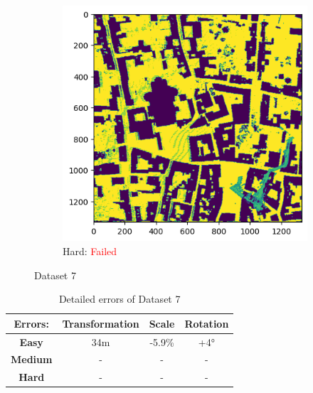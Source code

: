 \documentclass[11pt]{article}
\begin{document}
\begin{figure}[p]
        \vspace{1em}

        \begin{subfigure}{0.45\textwidth}
            \centering
            \includegraphics[width=\linewidth]{images/full/hard/5_2_4_hard}
            \caption{Hard: \textcolor{red}{Failed}}
            \label{fig:5_2_4_hard}
        \end{subfigure}
        \hfill

        \caption{Dataset 7}
        \label{fig:res_5_2_4}
    \end{figure}

    \begin{table}[p]
        \centering
        \begin{tabular}{|c|c|c|c|}
          \hline
          \textbf{Errors:} & \textbf{Transformation} & \textbf{Scale} & \textbf{Rotation} \\
          \hline
          \textbf{Easy}   & 34m  & -5.9\% & +4° \\
          \hline
          \textbf{Medium} & -  & - & - \\
          \hline
          \textbf{Hard}   & -  & - & - \\
          \hline
        \end{tabular}
        \caption{Detailed errors of Dataset 7}
        \label{tab:simpletable}
    \end{table}
\end{document}
